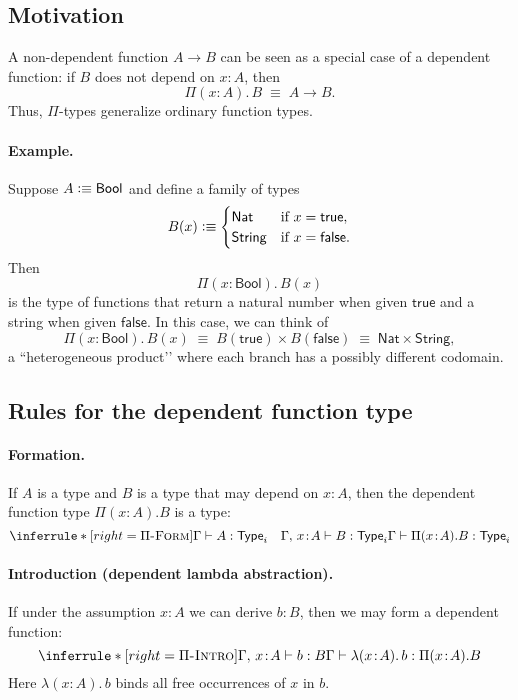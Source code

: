 \documentclass{article}
\newcommand{\Type}{\ensuremath{\mathsf{Type}}}
\newcommand{\defeq}{\vcentcolon\equiv}
\newcommand{\Nat}{\mathsf{Nat}}
\newcommand{\Bool}{\mathsf{Bool}}
\newcommand{\String}{\mathsf{String}}
\newcommand{\judg}[3]{#1 \vdash #2 : #3}   %
\newcommand{\jdeq}{\equiv}                 %
\newcommand{\rulename}[1]{\textsc{#1}}
\begin{document}
\subsection*{Motivation}

A non-dependent function \(A \to B\) can be seen as a special case of a dependent function:
if \(B\) does not depend on \(x:A\), then
\[
\Pi(x\!:\!A).\,B \;\jdeq\; A \to B.
\]
Thus, \(\Pi\)-types generalize ordinary function types.

\paragraph{Example.}
Suppose \(A \defeq \Bool\) and define a family of types
\[
B(x) \defeq
\begin{cases}
  \Nat & \text{if } x = \mathsf{true},\\
  \String & \text{if } x = \mathsf{false}.
\end{cases}
\]
Then
\[
\Pi(x\!:\!\Bool).\,B(x)
\]
is the type of functions that return a natural number when given \(\mathsf{true}\)
and a string when given \(\mathsf{false}\).  
In this case, we can think of
\[
\Pi(x\!:\!\Bool).\,B(x) \;\jdeq\; B(\mathsf{true}) \times B(\mathsf{false})
  \;\jdeq\; \Nat \times \String,
\]
a “heterogeneous product’’ where each branch has a possibly different codomain.

\subsection*{Rules for the dependent function type}

\paragraph{Formation.}
If \(A\) is a type and \(B\) is a type that may depend on \(x:A\),
then the dependent function type \(\Pi(x\!:\!A).B\) is a type:
\[
\inferrule*[right=\rulename{\(\Pi\)-Form}]{
  \judg{\Gamma}{A}{\Type_i}
  \quad
  \judg{\Gamma,\,x\!:\!A}{B}{\Type_i}
}{
  \judg{\Gamma}{\Pi(x\!:\!A).B}{\Type_i}
}
\]

\paragraph{Introduction (dependent lambda abstraction).}
If under the assumption \(x:A\) we can derive \(b:B\),
then we may form a dependent function:
\[
\inferrule*[right=\rulename{\(\Pi\)-Intro}]{
  \judg{\Gamma,\,x\!:\!A}{b}{B}
}{
  \judg{\Gamma}{\lambda(x\!:\!A).\,b}{\Pi(x\!:\!A).B}
}
\]
Here \(\lambda(x\!:\!A).\,b\) binds all free occurrences of \(x\) in \(b\).
\end{document}
